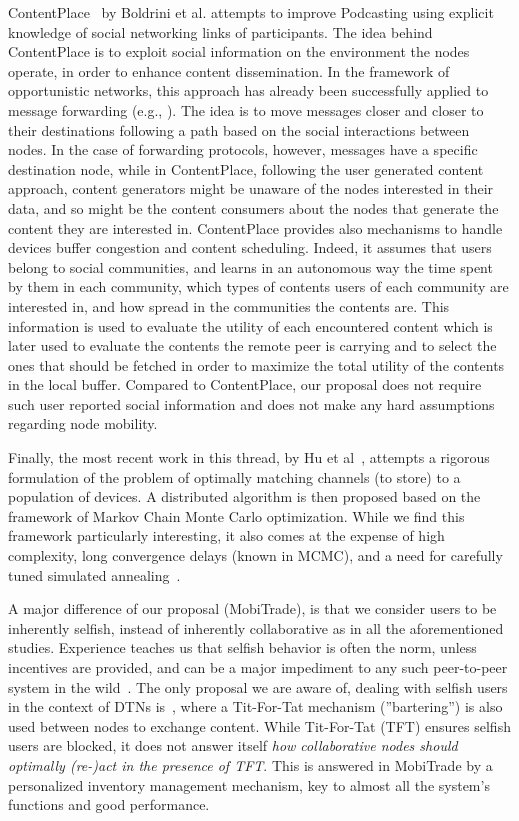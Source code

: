 ContentPlace~\cite{ContentPlace} by Boldrini et al. attempts to improve Podcasting using explicit knowledge of social networking links of participants. The idea behind ContentPlace is to exploit social information on the environment the nodes operate, in order to enhance content dissemination. In the framework of opportunistic networks, this approach has already been successfully applied to message forwarding (e.g., \cite{Boldrini:SocialForwarding}). The idea is to
move messages closer and closer to their destinations following a path based on the social interactions between nodes. In the case of forwarding protocols, however, messages have a specific destination node, while in ContentPlace, following the user generated content 
approach, content generators might be unaware of the nodes interested in their data, and so might be the content consumers about the
nodes that generate the content they are interested in. ContentPlace provides also mechanisms to handle devices buffer congestion and content scheduling. Indeed, it assumes that users belong to social communities, and learns in an autonomous way the time
spent by them in each community, which types of contents users of each community are interested in, and how
spread in the communities the contents are. This information is used to evaluate the utility of each encountered
content which is later used to evaluate the contents the remote peer is carrying and to select the ones that should be fetched in order to maximize the total utility of the 
contents in the local buffer. Compared to ContentPlace, our proposal does not require such user reported social information and does not make any hard assumptions regarding node mobility. 
 
Finally, the most recent work in this thread, by Hu et al~\cite{OptimalChannelChoice}, attempts a rigorous formulation of the problem of optimally matching channels (to store) to a population of devices. A distributed algorithm is then proposed based on the framework of Markov Chain Monte Carlo optimization. While we find this framework particularly interesting, it also comes at the expense of high complexity, long convergence delays (known in MCMC), and a need for carefully tuned simulated annealing~\cite{mcmc-bremaud}.

A major difference of our proposal (MobiTrade), is that we consider users to be inherently selfish, instead of inherently collaborative as in all the aforementioned studies. Experience teaches us that selfish behavior is often the norm, unless incentives are provided, and can be a major impediment to any such peer-to-peer system in the wild~\cite{NashEquilibria}. The only proposal we are aware of, dealing with selfish users in the context of DTNs is~\cite{BarterDTN}, where a Tit-For-Tat mechanism (''bartering'') is also used between nodes to exchange content. While Tit-For-Tat (TFT) ensures selfish users are blocked, it does not answer itself \emph{how collaborative nodes should optimally (re-)act in the presence of TFT}. This is answered in MobiTrade by a personalized inventory management mechanism, key to almost all the system's functions and good performance.

